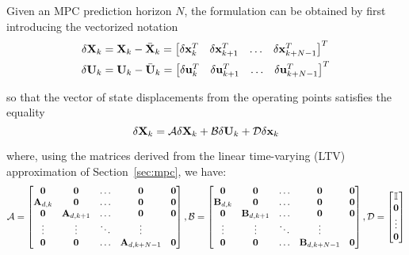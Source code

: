 \documentclass[../main.tex]{subfiles}
\begin{document}
Given an MPC prediction horizon $N$, the  formulation can be obtained by first
introducing the vectorized notation
\begin{equation*}
	\begin{aligned}
		\delta \mathbf{X}_k &= \mathbf{X}_k - \bar{\mathbf{X}}_k = \begin{bmatrix}
			\delta \mathbf{x}_k^T & \delta \mathbf{x}_{k+1}^T & \ldots & \delta
			\mathbf{x}_{k+N-1}^T
		\end{bmatrix}^T\\
		\delta \mathbf{U}_k &= \mathbf{U}_k - \bar{\mathbf{U}}_k = \begin{bmatrix}
			\delta \mathbf{u}_k^T & \delta \mathbf{u}_{k+1}^T & \ldots & \delta
			\mathbf{u}_{k+N-1}^T
		\end{bmatrix}^T
	\end{aligned}
\end{equation*}

so that the vector of state displacements from the operating points satisfies the
equality
\begin{equation}\label{eq:vectorized-states-displacement}
	\delta \mathbf{X}_k = \mathcal{A} \delta \mathbf{X}_k + \mathcal{B} \delta \mathbf{U}_k + \mathcal{D}	 \delta \mathbf{x}_k
\end{equation}

where, using the matrices derived from the linear time-varying (LTV)
approximation of Section~\ref{sec:mpc}, we have:
{\fontsize{9}{12}\selectfont
\begin{equation*}
	\mathcal{A} = \begin{bmatrix}
		\mathbf{0} & \mathbf{0} & \ldots & \mathbf{0} & \mathbf{0}\\
		\mathbf{A}_{d,k} & \mathbf{0} & \ldots & \mathbf{0} & \mathbf{0}\\
		\mathbf{0} & \mathbf{A}_{d,k+1} & \ldots & \mathbf{0} & \mathbf{0}\\
		\vdots & \vdots & \ddots & \vdots\\
		\mathbf{0} & \mathbf{0} & \ldots & \mathbf{A}_{d,k+N-1} & \mathbf{0}
	\end{bmatrix}, 
	\mathcal{B} = \begin{bmatrix}
		\mathbf{0} & \mathbf{0} & \ldots & \mathbf{0} & \mathbf{0}\\
		\mathbf{B}_{d,k} & \mathbf{0} & \ldots & \mathbf{0} & \mathbf{0}\\
		\mathbf{0} & \mathbf{B}_{d,k+1} & \ldots & \mathbf{0} & \mathbf{0}\\
		\vdots & \vdots & \ddots & \vdots\\
		\mathbf{0} & \mathbf{0} & \ldots & \mathbf{B}_{d,k+N-1} & \mathbf{0}
	\end{bmatrix},
	\mathcal{D} = \begin{bmatrix}
		\mathbb{I}\\
		\mathbf{0}\\
		\vdots\\
		\mathbf{0}\\
	\end{bmatrix}
\end{equation*}
}
\end{document}
